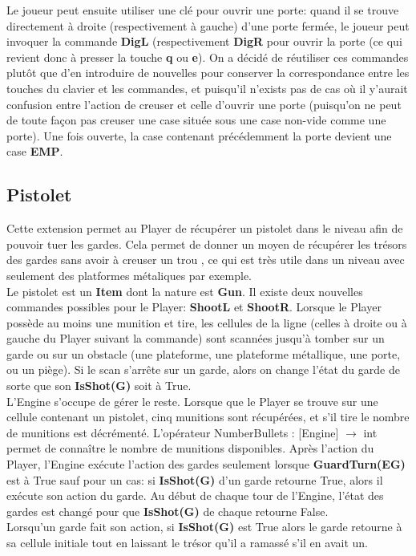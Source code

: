 \documentclass{article}
\begin{document}
Le joueur peut ensuite utiliser une clé pour ouvrir une porte: quand il se trouve directement à droite (respectivement à gauche) d'une porte fermée, le joueur peut invoquer la commande \textbf{DigL} (respectivement \textbf{DigR} pour ouvrir la porte (ce qui revient donc à presser la touche \textbf{q} ou \textbf{e}). On a décidé de réutiliser ces commandes plutôt que d'en introduire de nouvelles pour conserver la correspondance entre les touches du clavier et les commandes, et puisqu'il n'exists pas de cas où il y'aurait confusion entre l'action de creuser et celle d'ouvrir une porte (puisqu'on ne peut de toute façon pas creuser une case située sous une case non-vide comme une porte). Une fois ouverte, la case contenant précédemment la porte devient une case \textbf{EMP}.

\subsection{Pistolet}

Cette extension permet au Player de récupérer un pistolet dans le niveau afin de pouvoir tuer les gardes. Cela permet de donner un moyen de récupérer les trésors des gardes sans avoir à creuser un trou , ce qui est très utile dans un niveau avec seulement des platformes métaliques par exemple.\\

Le pistolet est un \textbf{Item} dont la nature est \textbf{Gun}. Il existe deux nouvelles commandes possibles pour le Player: \textbf{ShootL} et \textbf{ShootR}. Lorsque le Player possède au moins une munition et tire, les cellules de la ligne (celles à droite ou à gauche du Player suivant la commande) sont scannées jusqu'à tomber sur un garde ou sur un obstacle (une plateforme, une plateforme métallique, une porte, ou un piège). Si le scan s'arrête  sur un garde, alors on change l'état du garde de sorte que son \textbf{IsShot(G)} soit à True.\\

L'Engine s'occupe de gérer le reste. Lorsque que le Player se trouve sur une cellule contenant un pistolet, cinq munitions sont récupérées, et s'il tire le nombre de munitions est décrémenté. L'opérateur \textrm{NumberBullets : [Engine] $\rightarrow$ int} permet de connaître le nombre de munitions disponibles. Après l'action du Player, l'Engine exécute l'action des gardes seulement lorsque \textbf{GuardTurn(EG)} est à True sauf pour un cas: si \textbf{IsShot(G)} d'un garde retourne True, alors il exécute son action du garde. Au début de chaque tour de l'Engine, l'état des gardes est changé pour que \textbf{IsShot(G)} de chaque retourne False.\\

Lorsqu'un garde fait son action, si \textbf{IsShot(G)} est True alors le garde retourne à sa cellule initiale tout en laissant le trésor qu'il a ramassé s'il en avait un.
\end{document}
